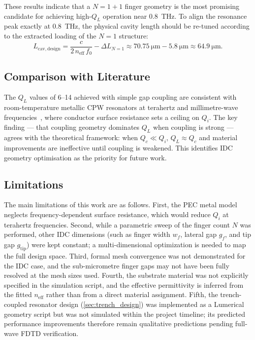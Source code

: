 \documentclass[12pt,a4paper]{article}
\begin{document}
These results indicate that a $N=1+1$ finger geometry is the most promising candidate for achieving high-$Q_L$ operation near \SI{0.8}{\tera\hertz}. To align the resonance peak exactly at \SI{0.8}{\tera\hertz}, the physical cavity length should be re-tuned according to the extracted loading of the $N=1$ structure:
\begin{equation}
    L_{\mathrm{cav,design}} = \frac{c}{2\,n_{\mathrm{eff}}\,f_0} - \Delta L_{N=1} \approx \SI{70.75}{\micro\metre} - \SI{5.8}{\micro\metre} \approx \SI{64.9}{\micro\metre}.
\end{equation}

\subsection{Comparison with Literature}

The $Q_L$ values of 6--14 achieved with simple gap coupling are consistent
with room-temperature metallic CPW resonators at terahertz and
millimetre-wave frequencies~\cite{Goppl2008}, where conductor surface
resistance sets a ceiling on $Q_i$. The key finding --- that coupling
geometry dominates $Q_L$ when coupling is strong --- agrees with the
theoretical framework: when $Q_c \ll Q_i$, $Q_L \approx Q_c$ and
material improvements are ineffective until coupling is weakened. This
identifies IDC geometry optimisation as the priority for future work.

\subsection{Limitations}

The main limitations of this work are as follows. First, the PEC metal
model neglects frequency-dependent surface resistance, which would reduce
$Q_i$ at terahertz frequencies. Second, while a parametric sweep of the
finger count $N$ was performed, other IDC dimensions (such as finger
width $w_f$, lateral gap $g_f$, and tip gap $g_{\mathrm{tip}}$) were kept
constant; a multi-dimensional optimization is needed to map the full design
space. Third, formal mesh convergence was not demonstrated for the IDC
case, and the sub-micrometre finger gaps may not have been fully resolved at
the mesh sizes used. Fourth, the substrate material was not explicitly
specified in the simulation script, and the effective permittivity is
inferred from the fitted $n_{\mathrm{eff}}$ rather than from a direct
material assignment. Fifth, the trench-coupled resonator design
(\cref{sec:trench_design}) was implemented as a Lumerical geometry script
but was not simulated within the project timeline; its predicted
performance improvements therefore remain qualitative predictions pending
full-wave FDTD verification.
\end{document}
